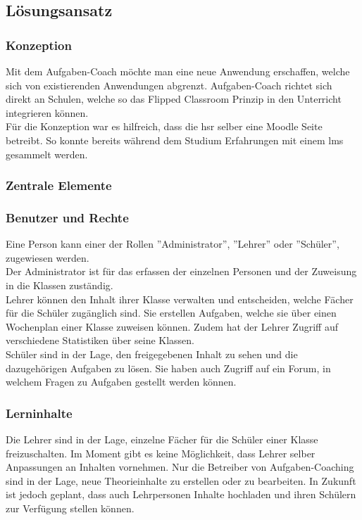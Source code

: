 \subsection{Lösungsansatz}
\subsubsection{Konzeption}
Mit dem Aufgaben-Coach möchte man eine neue Anwendung erschaffen, welche sich von existierenden Anwendungen abgrenzt. Aufgaben-Coach richtet sich direkt an Schulen, welche so das Flipped Classroom Prinzip in den Unterricht integrieren können. \\

Für die Konzeption war es hilfreich, dass die \gls{hsr} selber eine Moodle Seite betreibt. So konnte bereits während dem Studium Erfahrungen mit einem \gls{lms} gesammelt werden.

\subsubsection{Zentrale Elemente}
\subsubsection*{Benutzer und Rechte}
Eine Person kann einer der Rollen ''Administrator'', ''Lehrer'' oder ''Schüler'', zugewiesen werden. \\

Der Administrator ist für das erfassen der einzelnen Personen und der Zuweisung in die Klassen zuständig. \\

Lehrer können den Inhalt ihrer Klasse verwalten und entscheiden, welche Fächer für die Schüler zugänglich sind. Sie erstellen Aufgaben, welche sie über einen Wochenplan einer Klasse zuweisen können. Zudem hat der Lehrer Zugriff auf verschiedene Statistiken über seine Klassen. \\

Schüler sind in der Lage, den freigegebenen Inhalt zu sehen und die dazugehörigen Aufgaben zu lösen. Sie haben auch Zugriff auf ein Forum, in welchem Fragen zu Aufgaben gestellt werden können.

\subsubsection*{Lerninhalte}
Die Lehrer sind in der Lage, einzelne Fächer für die Schüler einer Klasse freizuschalten. Im Moment gibt es keine Möglichkeit, dass Lehrer selber Anpassungen an Inhalten vornehmen. Nur die Betreiber von Aufgaben-Coaching sind in der Lage, neue Theorieinhalte zu erstellen oder zu bearbeiten. In Zukunft ist jedoch geplant, dass auch Lehrpersonen Inhalte hochladen und ihren Schülern zur Verfügung stellen können.


